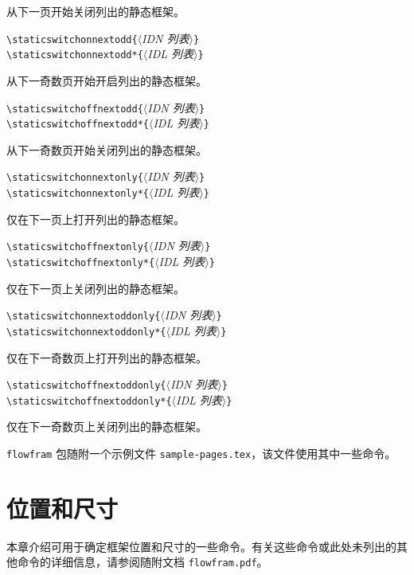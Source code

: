 \documentclass[a4paper]{book}%
\newcommand{\sty}[1]{\texttt{#1}}
\newcommand{\filename}[1]{\texttt{#1}}
\newcommand{\meta}[1]{\textnormal{\ensuremath{\langle}\makebox[0pt][l]{}\emph{#1}\makebox[0pt][l]{}\ensuremath{\rangle}}}
\begin{document}
从下一页开始关闭列出的静态框架。
\begin{mdframed}
    \verb|\staticswitchonnextodd{|\meta{IDN 列表}\verb|}|\\
    \verb|\staticswitchonnextodd*{|\meta{IDL 列表}\verb|}|
\end{mdframed}
从下一奇数页开始开启列出的静态框架。
\begin{mdframed}
    \verb|\staticswitchoffnextodd{|\meta{IDN 列表}\verb|}|\\
    \verb|\staticswitchoffnextodd*{|\meta{IDL 列表}\verb|}|
\end{mdframed}
从下一奇数页开始关闭列出的静态框架。
\begin{mdframed}
    \verb|\staticswitchonnextonly{|\meta{IDN 列表}\verb|}|\\
    \verb|\staticswitchonnextonly*{|\meta{IDL 列表}\verb|}|
\end{mdframed}
仅在下一页上打开列出的静态框架。
\begin{mdframed}
    \verb|\staticswitchoffnextonly{|\meta{IDN 列表}\verb|}|\\
    \verb|\staticswitchoffnextonly*{|\meta{IDL 列表}\verb|}|
\end{mdframed}
仅在下一页上关闭列出的静态框架。
\begin{mdframed}
    \verb|\staticswitchonnextoddonly{|\meta{IDN 列表}\verb|}|\\
    \verb|\staticswitchonnextoddonly*{|\meta{IDL 列表}\verb|}|
\end{mdframed}
仅在下一奇数页上打开列出的静态框架。
\begin{mdframed}
    \verb|\staticswitchoffnextoddonly{|\meta{IDN 列表}\verb|}|\\
    \verb|\staticswitchoffnextoddonly*{|\meta{IDL 列表}\verb|}|
\end{mdframed}
仅在下一奇数页上关闭列出的静态框架。

\sty{flowfram} 包随附一个示例文件 \filename{sample-pages.tex}，该文件使用其中一些命令。
\chapter{位置和尺寸}\label{chap-4}%
本章介绍可用于确定框架位置和尺寸的一些命令。有关这些命令或此处未列出的其他命令的详细信息，请参阅随附文档 \filename{flowfram.pdf}。
\end{document}
